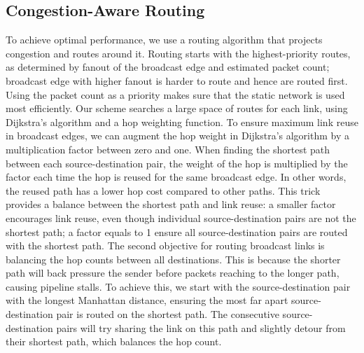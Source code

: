 \subsection{Congestion-Aware Routing} \label{sec:route}
To achieve optimal performance, we use a routing algorithm that projects congestion and routes around it. 
Routing starts with the highest-priority routes, as determined by fanout of the broadcast edge and
estimated packet count; broadcast edge with higher fanout is harder to route and hence are routed
first.
Using the packet count as a priority makes sure that the static network is used most efficiently.
Our scheme searches a large space of routes for each link, using Dijkstra's algorithm \cite{dijkstra} and a hop weighting function.
To ensure maximum link reuse in broadcast edges, we can augment the hop weight in Dijkstra's
algorithm by a multiplication factor between zero and one. 
When finding the shortest path between each source-destination pair, the weight of the hop is
multiplied by the factor each time the hop is reused for the same broadcast edge.
In other words, the reused path has a lower hop cost compared to other paths.
This trick provides a balance between the shortest path and link reuse: a smaller factor encourages link
reuse, even though individual source-destination pairs are not the shortest path; a factor equals to 1 ensure all source-destination pairs are routed with the shortest path.
The second objective for routing broadcast links is balancing the hop counts between all
destinations. This is because the shorter path will back pressure the sender before packets reaching to the longer path, causing pipeline stalls.
To achieve this, we start with the source-destination pair with the longest Manhattan distance, ensuring
the most far apart source-destination pair is routed on the shortest path.
The consecutive source-destination pairs will try sharing the link on this path and slightly detour from
their shortest path, which balances the hop count.

